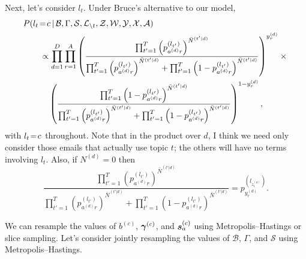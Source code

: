 \documentclass[10pt,english,oneside]{article}
\begin{document}
Next, let's consider $l_t$. Under Bruce's alternative to our model,
\begin{align}
&P(l_t \!=\! c \,|\, \mathcal{B}, \Gamma, \mathcal{S},
  \mathcal{L}_{\setminus t}, \mathcal{Z}, \mathcal{W}, \mathcal{Y},
  \mathcal{X}, \mathcal{A}) \notag \\
  &\qquad \propto \prod_{d=1}^D \prod_{r=1}^A \left(
  \frac{\prod_{t'=1}^T
    \left( p^{(l_{t'})}_{a^{(d)}r}\right)^{\bar{N}^{(t'|d)}}
  }{\prod_{t'=1}^T     \left(
    p^{(l_{t'})}_{a^{(d)}r}\right)^{\bar{N}^{(t'|d)}} +
    \prod_{t'=1}^T     \left( 1 - p^{(l_{t'})}_{a^{(d)}r}\right)^{\bar{N}^{(t'|d)}}}
  \right)^{y^{(d)}_r} \times {} \notag \\
  &\qquad \quad \left(
  \frac{ \prod_{t'=1}^T
    \left( 1 - p^{(l_{t'})}_{a^{(d)}r}\right)^{\bar{N}^{(t'|d)}}
  }{
    \prod_{t'=1}^T     \left(
    p^{(l_{t'})}_{a^{(d)}r}\right)^{\bar{N}^{(t'|d)}}
     + \prod_{t'=1}^T
         \left( 1 -p^{(l_{t'})}_{a^{(d)}r}\right)^{\bar{N}^{(t'|d)}}
  }
  \right)^{1 - y^{(d)}_r},
\end{align}
with $l_t \!=\! c$ throughout. Note that in the product over $d$, I
think we need only consider those emails that actually use topic $t$;
the others will have no terms involving $l_t$. Also, if $N^{(d)} = 0$
then
\begin{equation}
  \frac{ \prod_{t'=1}^T
    \left(p^{(l_{t'})}_{a^{(d)}r}\right)^{\bar{N}^{(t'|d)}}
  }{
    \prod_{t'=1}^T     \left(
    p^{(l_{t'})}_{a^{(d)}r}\right)^{\bar{N}^{(t'|d)}}
     + \prod_{t'=1}^T
         \left( 1 -p^{(l_{t'})}_{a^{(d)}r}\right)^{\bar{N}^{(t'|d)}}
  } = p^{(l_{z_1^{(d)}})}_{y^{(d)}_r}.
  \end{equation}

We can resample the values of $b^{(c)}$, $\boldsymbol{\gamma}^{(c)}$, and
$\boldsymbol{s}_a^{(c)}$ using Metropolis--Hastings or slice sampling. Let's
consider jointly resampling the values of $\mathcal{B}$, $\Gamma$, and
$\mathcal{S}$ using Metropolis--Hastings.
\end{document}
